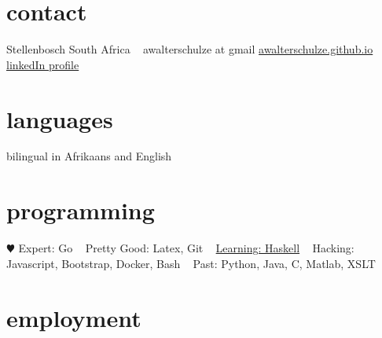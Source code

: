 \documentclass[]{friggeri-cv} %
\begin{document}

\begin{aside} %
\section{contact}
Stellenbosch
South Africa
~
awalterschulze at gmail
\href{http://awalterschulze.github.io}{awalterschulze.github.io}
\href{https://za.linkedin.com/in/schulzewalter}{linkedIn profile}
\section{languages}
bilingual in Afrikaans and English
\section{programming}
{\color{red} $\varheartsuit$} 
Expert: 
Go
~
Pretty Good: 
Latex, Git
~
\href{https://trello.com/b/ij35amXZ/mylearninghaskell}{Learning: Haskell}
~
Hacking:
Javascript, Bootstrap, Docker, Bash
~
Past:
Python, Java, C, Matlab, XSLT
\end{aside}

\section{employment}
\end{document}
